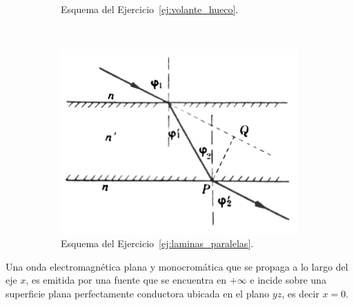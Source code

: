 \documentclass[addpoints]{exam}
\newcommand{\ver}[1]{\hat{\mathbf{#1}}}
\begin{document}
\begin{questions}
\begin{figure}[ht]
\begin{subfigure}{0.45\textwidth}
\begin{tikzpicture}
            \end{tikzpicture}
            \caption{Esquema del Ejercicio~\ref{ej:volante_hueco}.}
            \label{fig:volante_hueco}
        \end{subfigure}
        ~
        \begin{subfigure}{0.45\textwidth}
            \centering
            \includegraphics[width=\textwidth]{../../figs/lamina caras paralelas.pdf}
            \caption{Esquema del Ejercicio~\ref{ej:laminas_paralelas}.}
            \label{fig:lamina_paralelas}
        \end{subfigure}
        \caption{}
    \end{figure}

    \pagebreak

    \question Una onda electromagnética plana y monocromática que se propaga a lo largo del eje $x$, es emitida por una fuente que se encuentra en $+\infty$ e incide sobre una superficie plana perfectamente conductora ubicada en el plano $yz$, es decir $x=0$.
\end{questions}
\end{document}

